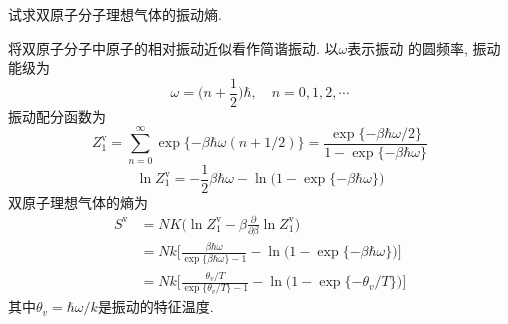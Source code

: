 \begin{problem}[7.18]
试求双原子分子理想气体的振动熵.
\end{problem}
\begin{solution}
将双原子分子中原子的相对振动近似看作简谐振动. 以$\omega$表示振动
的圆频率, 振动能级为
\[
\omega = \bigg(n+\frac{1}{2}\bigg)\hbar,\quad n=0,1,2,\cdots
\]
振动配分函数为
\[
Z_1^\mathrm{v} = \sum_{n=0}^\infty \exp\{ -\beta \hbar \omega (n+1/2)\}
= \frac{\exp\{-\beta\hbar\omega/2\}}{1-\exp\{-\beta\hbar\omega\}}
\]
\[
\ln Z_1^\mathrm{v} = -\frac{1}{2}\beta\hbar \omega -\ln\Big(1-\exp\{-\beta\hbar\omega\}\Big)
\]
双原子理想气体的熵为
\begin{align*}
S^{\mathrm{v}} & =NK\bigg(\ln Z_{1}^{\mathrm{v}}-\beta\frac{\partial}{\partial\beta}\ln Z_{1}^{\mathrm{v}}\bigg)\\
 & =Nk\bigg[\frac{\beta\hbar\omega}{\exp\{\beta\hbar\omega\}-1}-\ln\big(1-\exp\{-\beta\hbar\omega\}\big)\bigg]\\
 & =Nk\bigg[\frac{\theta_{v}/T}{\exp\{\theta_{v}/T\}-1}-\ln\big(1-\exp\{-\theta_{v}/T\}\big)\bigg]
\end{align*}
其中$\theta_v=\hbar\omega/k$是振动的特征温度.
\end{solution}
